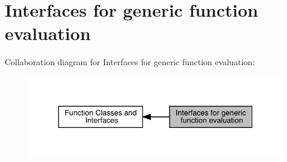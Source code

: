 \hypertarget{group__GenFunc}{}\section{Interfaces for generic function evaluation}
\label{group__GenFunc}
Collaboration diagram for Interfaces for generic function evaluation\+:\nopagebreak
\begin{figure}[H]
\begin{center}
\leavevmode
\includegraphics[width=338pt]{df/d4a/group__GenFunc}
\end{center}
\end{figure}
